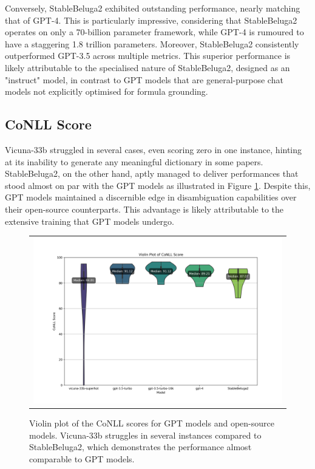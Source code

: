 Conversely, StableBeluga2 exhibited outstanding performance, nearly matching that of GPT-4. This is particularly impressive, considering that StableBeluga2 operates on only a 70-billion parameter framework, while GPT-4 is rumoured to have a staggering 1.8 trillion parameters. Moreover, StableBeluga2 consistently outperformed GPT-3.5 across multiple metrics. This superior performance is likely attributable to the specialised nature of StableBeluga2, designed as an "instruct" model, in contrast to GPT models that are general-purpose chat models not explicitly optimised for formula grounding.

\subsection{CoNLL Score}

Vicuna-33b struggled in several cases, even scoring zero in one instance, hinting at its inability to generate any meaningful dictionary in some papers. StableBeluga2, on the other hand, aptly managed to deliver performances that stood almost on par with the GPT models as illustrated in Figure \ref{fig:open-source-conll}. Despite this, GPT models maintained a discernible edge in disambiguation capabilities over their open-source counterparts. This advantage is likely attributable to the extensive training that GPT models undergo.

\begin{figure}[ht]
  \centering
  \begin{tabular}{c}
  \includegraphics[width=14cm]{images/open-conll-score.png}
  \end{tabular}
  \caption[CoNLL Score Open Source]{Violin plot of the CoNLL scores for GPT models and open-source models. Vicuna-33b struggles in several instances compared to StableBeluga2, which demonstrates the performance almost comparable to GPT models.}\label{fig:open-source-conll}
\end{figure}

